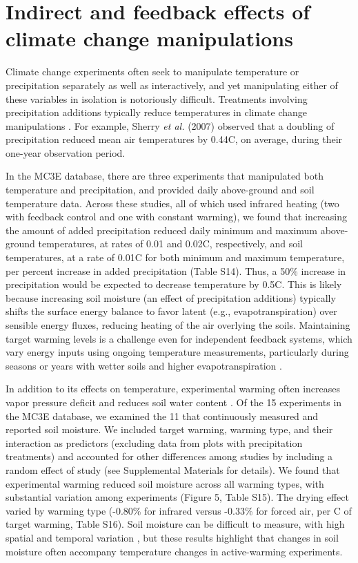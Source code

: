 \documentclass{article}
\begin{document}
\section* {Indirect and feedback effects of climate change manipulations} 
Climate change experiments often seek to manipulate temperature or precipitation separately as well as interactively, and yet manipulating either of these variables in isolation is notoriously difficult. Treatments involving precipitation additions typically reduce temperatures in climate change manipulations \citep{sherry2007,rollinson2012,mcdaniel2014}. For example, Sherry \emph{et al.} (2007) observed that a doubling of precipitation reduced mean air temperatures by 0.44\degree C, on average, during their one-year observation period. 
\par In the MC3E database, there are three experiments that manipulated both temperature and precipitation, and provided daily above-ground and soil temperature data. Across these studies, all of which used infrared heating (two with feedback control and one with constant warming), we found that increasing the amount of added precipitation reduced daily minimum and maximum above-ground temperatures, at rates of 0.01 and 0.02\degree C, respectively, and soil temperatures, at a rate of 0.01\degree C for both minimum and maximum temperature, per percent increase in added precipitation (Table S14). Thus, a 50\% increase in precipitation would be expected to decrease temperature by 0.5\degree C.
This is likely because increasing soil moisture (an effect of precipitation additions) typically shifts the surface energy balance to favor latent (e.g., evapotranspiration) over sensible energy fluxes, reducing heating of the air overlying the soils. Maintaining target warming levels is a challenge even for independent feedback systems, which vary energy inputs using ongoing temperature measurements, particularly during seasons or years with wetter soils and higher evapotranspiration \citep{rich2015}.
\par In addition to its effects on temperature, experimental warming often increases vapor pressure deficit and reduces soil water content \citep[e.g.,][]{harte1995b,sherry2007,morin2010,pelini2014,templer2016}. Of the 15 experiments in the MC3E database, we examined the 11 that continuously measured and reported soil moisture. We included target warming, warming type, and their interaction as predictors (excluding data from plots with precipitation treatments) and accounted for other differences among studies by including a random effect of study (see Supplemental Materials for details). We found that experimental warming reduced soil moisture across all warming types, with substantial variation among experiments (Figure 5, Table S15). The drying effect varied by warming type (-0.80\% for infrared versus -0.33\% for forced air, per \degree C of target warming, Table S16). Soil moisture can be difficult to measure, with high spatial and temporal variation \citep{famiglietti1999,teuling2005}, but these results highlight that changes in soil moisture often accompany temperature changes in active-warming experiments.
\end{document}
